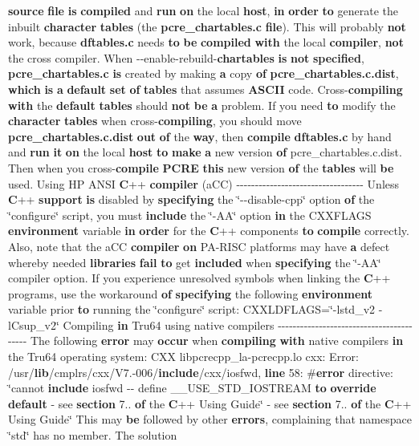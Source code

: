 {\bf source} {\bf file} {\bf is} {\bf compiled} and {\bf run} {\bf on} the local {\bf host}, {\bf in} {\bf order} {\bf to} generate the inbuilt {\bf character} {\bf tables} (the {\bf pcre\+\_\+chartables.\+c} {\bf file}). This will probably {\bf not} work, because {\bf dftables.\+c} needs {\bf to} {\bf be} {\bf compiled} {\bf with} the local {\bf compiler}, {\bf not} the cross compiler. When -\/-\/enable-\/rebuild-\/{\bf chartables} {\bf is} {\bf not} {\bf specified}, {\bf pcre\+\_\+chartables.\+c} {\bf is} created by making {\bf a} copy {\bf of} {\bf pcre\+\_\+chartables.\+c.\+dist}, {\bf which} {\bf is} {\bf a} {\bf default} {\bf set} {\bf of} {\bf tables} that assumes {\bf A\+S\+C\+II} code. Cross-\/{\bf compiling} {\bf with} the {\bf default} {\bf tables} should {\bf not} {\bf be} {\bf a} problem. If you need {\bf to} modify the {\bf character} {\bf tables} when cross-\/{\bf compiling}, you should move {\bf pcre\+\_\+chartables.\+c.\+dist} {\bf out} {\bf of} the {\bf way}, then {\bf compile} {\bf dftables.\+c} by hand and {\bf run} {\bf it} {\bf on} the local {\bf host} {\bf to} {\bf make} {\bf a} new version {\bf of} pcre\+\_\+chartables.\+c.\+dist. Then when you cross-\/{\bf compile} {\bf P\+C\+RE} {\bf this} new version {\bf of} the {\bf tables} will {\bf be} used. Using HP A\+N\+SI {\bf C}++ {\bf compiler} (a\+CC) -\/-\/-\/-\/-\/-\/-\/-\/-\/-\/-\/-\/-\/-\/-\/-\/-\/-\/-\/-\/-\/-\/-\/-\/-\/-\/-\/-\/-\/-\/-\/-\/-\/-\/ Unless {\bf C}++ {\bf support} {\bf is} disabled by {\bf specifying} the \char`\"{}-\/-\/disable-\/cpp\char`\"{} option {\bf of} the \char`\"{}configure\char`\"{} script, you must {\bf include} the \char`\"{}-\/AA\char`\"{} option {\bf in} the C\+X\+X\+F\+L\+A\+GS {\bf environment} variable {\bf in} {\bf order} for the {\bf C}++ components {\bf to} {\bf compile} correctly. Also, note that the a\+CC {\bf compiler} {\bf on} PA-\/R\+I\+SC platforms may have {\bf a} defect whereby needed {\bf libraries} {\bf fail} {\bf to} get {\bf included} when {\bf specifying} the \char`\"{}-\/AA\char`\"{} compiler option. If you experience unresolved symbols when linking the {\bf C}++ programs, use the workaround {\bf of} {\bf specifying} the following {\bf environment} variable prior {\bf to} running the \char`\"{}configure\char`\"{} script\+: C\+X\+X\+L\+D\+F\+L\+A\+GS=\char`\"{}-\/lstd\+\_\+v2 -\/l\+Csup\+\_\+v2\char`\"{} Compiling {\bf in} Tru64 using native compilers -\/-\/-\/-\/-\/-\/-\/-\/-\/-\/-\/-\/-\/-\/-\/-\/-\/-\/-\/-\/-\/-\/-\/-\/-\/-\/-\/-\/-\/-\/-\/-\/-\/-\/-\/-\/-\/-\/-\/-\/-\/ The following {\bf error} may {\bf occur} when {\bf compiling} {\bf with} native compilers {\bf in} the Tru64 operating system\+: C\+XX libpcrecpp\+\_\+la-\/pcrecpp.\+lo cxx\+: Error\+: /usr/{\bf lib}/cmplrs/cxx/V7.-\/006/{\bf include}/cxx/iosfwd, {\bf line} 58\+: \#{\bf error} directive\+: \char`\"{}cannot {\bf include} iosfwd -\/-\/ define \+\_\+\+\_\+\+U\+S\+E\+\_\+\+S\+T\+D\+\_\+\+I\+O\+S\+T\+R\+E\+AM {\bf to} {\bf override} {\bf default} -\/ see {\bf section} 7.. {\bf of} the {\bf C}++ Using Guide\char`\"{} -\/ see {\bf section} 7.. {\bf of} the {\bf C}++ Using Guide\char`\"{} This may {\bf be} followed by other {\bf errors}, complaining that \textquotesingle{}namespace \char`\"{}std\char`\"{} has no member\textquotesingle{}. The solution 